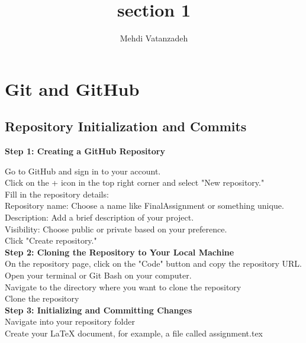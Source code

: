 \documentclass{article}
\title{section 1}
\author{Mehdi Vatanzadeh}
\begin{document}
\maketitle

\section{Git and GitHub}

\subsection{Repository Initialization and Commits}
\textbf{Step 1: Creating a GitHub Repository}

Go to GitHub and sign in to your account.\\

Click on the + icon in the top right corner and select "New repository."\\

Fill in the repository details:\\

Repository name: Choose a name like FinalAssignment or something unique.\\

Description: Add a brief description of your project.\\

Visibility: Choose public or private based on your preference.\\

Click "Create repository."
\\
\textbf{Step 2: Cloning the Repository to Your Local Machine}\\

On the repository page, click on the "Code" button and copy the repository URL.\\

Open your terminal or Git Bash on your computer.\\

Navigate to the directory where you want to clone the repository\\

Clone the repository\\

\textbf{Step 3: Initializing and Committing Changes}\\

Navigate into your repository folder\\

Create your LaTeX document, for example, a file called assignment.tex\\
\end{document}

